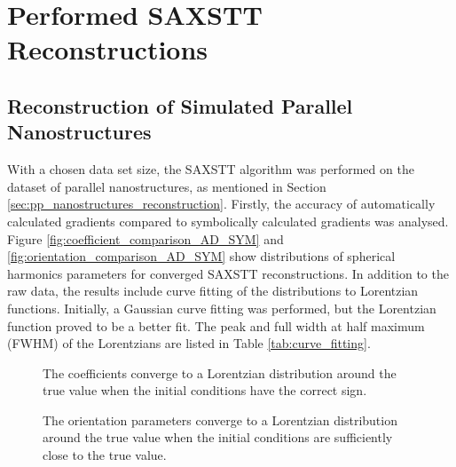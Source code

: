 \chapter{Performed SAXSTT Reconstructions}

\section{Reconstruction of Simulated Parallel Nanostructures}
\label{sec:reconstruction_parallel}

With a chosen data set size,
the SAXSTT algorithm was performed on the dataset of parallel nanostructures, as mentioned in Section \ref{sec:pp_nanostructures_reconstruction}.
Firstly, the accuracy of automatically calculated gradients compared to symbolically calculated gradients was analysed.
Figure \ref{fig:coefficient_comparison_AD_SYM} and \ref{fig:orientation_comparison_AD_SYM} show distributions of spherical harmonics parameters for converged SAXSTT reconstructions.
In addition to the raw data, the results include curve fitting of the distributions to Lorentzian functions. %
Initially, a Gaussian curve fitting was performed, but the Lorentzian function proved to be a better fit.
The peak and full width at half maximum (FWHM) of the Lorentzians are listed in Table \ref{tab:curve_fitting}.

\begin{figure}[h!]
    \centering
    
    \caption{ The coefficients converge to a Lorentzian distribution
        around the true value when the initial conditions have the correct sign.  }
    \label{fig:coefficient_comparison_AD_SYM_difficult}
\end{figure}

\begin{figure}[h!]
    \centering
    
    \caption{  The orientation parameters converge to a Lorentzian distribution
        around the true value when the initial conditions are sufficiently close to the true value.}
    \label{fig:orientation_comparison_AD_SYM_difficult}
\end{figure}


